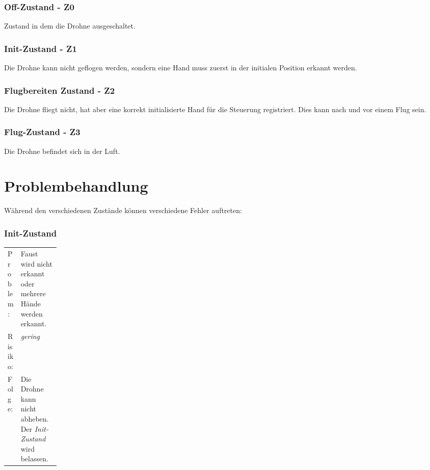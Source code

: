\subsubsection{Off-Zustand - Z0}
Zustand in dem die Drohne ausgeschaltet.

\subsubsection{Init-Zustand - Z1}
Die Drohne kann nicht geflogen werden, sondern eine Hand muss zuerst in der initialen Position erkannt werden.

\subsubsection{Flugbereiten Zustand - Z2}
Die Drohne fliegt nicht, hat aber eine korrekt initialisierte Hand für die Steuerung registriert. Dies kann nach und vor einem Flug sein.

\subsubsection{Flug-Zustand - Z3}
Die Drohne befindet sich in der Luft.



\section{Problembehandlung}
Während den verschiedenen Zustände können verschiedene Fehler auftreten:

\subsubsection{Init-Zustand}

\begin{table}[H]
	\centering
	\small\renewcommand{\arraystretch}{1.4}
	\begin{tabularx}{0.9\textwidth}{ L{0.121\linewidth} | X  }%
		\hline
		Problem: & Faust wird nicht erkannt oder mehrere Hände werden erkannt.\\
		Risiko: & \textit{gering}\\
		Folge: & Die Drohne kann nicht abheben. Der \textit{Init-Zustand} wird belassen.\\
		\hline
	\end{tabularx}
\end{table}



